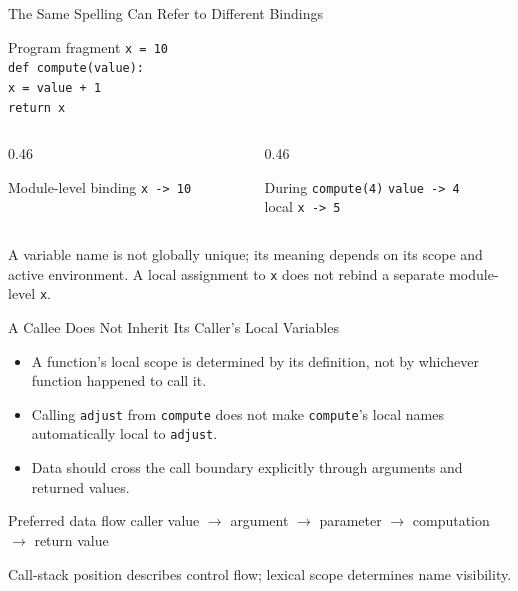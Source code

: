 \documentclass[aspectratio=169,10pt]{beamer}
\begin{document}
\begin{frame}[shrink=3]{The Same Spelling Can Refer to Different Bindings}
  \begin{block}{Program fragment}
    \texttt{x = 10}\\[0.06in]
    \texttt{def compute(value):}\\
    \hspace*{0.20in}\texttt{x = value + 1}\\
    \hspace*{0.20in}\texttt{return x}
  \end{block}

  \begin{columns}[T,onlytextwidth]
    \begin{column}{0.46\textwidth}
      \begin{block}{Module-level binding}
        \texttt{x -> 10}
      \end{block}
    \end{column}

    \begin{column}{0.46\textwidth}
      \begin{block}{During \texttt{compute(4)}}
        \texttt{value -> 4}\\
        local \texttt{x -> 5}
      \end{block}
    \end{column}
  \end{columns}

  \begin{keyidea}
    A variable name is not globally unique; its meaning depends on its scope and active environment. A local assignment to \texttt{x} does not rebind a separate module-level \texttt{x}.
  \end{keyidea}
\end{frame}

\begin{frame}{A Callee Does Not Inherit Its Caller's Local Variables}
  \begin{itemize}
    \item A function's local scope is determined by its definition, not by whichever function happened to call it.
    \item Calling \texttt{adjust} from \texttt{compute} does not make \texttt{compute}'s local names automatically local to \texttt{adjust}.
    \item Data should cross the call boundary explicitly through arguments and returned values.
  \end{itemize}

  \begin{block}{Preferred data flow}
    \centering
    caller value $\rightarrow$ argument $\rightarrow$ parameter $\rightarrow$ computation $\rightarrow$ return value
  \end{block}

  \begin{keyidea}
    Call-stack position describes control flow; lexical scope determines name visibility.
  \end{keyidea}
\end{frame}
\end{document}
